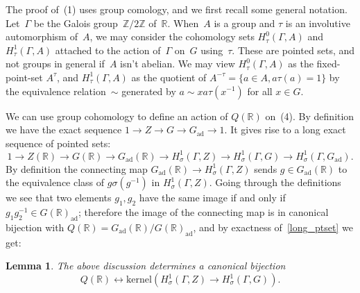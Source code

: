 \documentclass[10pt,leqno]{article}
\newtheorem{lemma}[equation]{Lemma}
\newcommand{\kernel}{\mathrm{kernel}}
\newcommand{\Gad}{G_\mathrm{ad}}
\newcommand{\R}{\mathbb R}
\newcommand{\Z}{\mathbb Z}
\newcommand\inv{^{-1}}
\begin{document}
The proof of~(1) uses group comology, and we first recall some general notation. Let~$\Gamma$ be the Galois group~$\Z/2\Z$ of~$\R$. When~$A$ is a group and $\tau$ is an involutive automorphism of~$A$, we may consider the cohomology sets $H^0_\tau(\Gamma, A)$ and $H^1_\tau(\Gamma, A)$ attached to the action of~$\Gamma$ on~$G$ using~$\tau$.  These are pointed sets, and not groups in general if~$A$ isn't abelian. We may view $H^0_\tau(\Gamma, A)$ as the fixed-point-set $A^{\tau}$, and $H^1_\tau(\Gamma,A)$ as the quotient of $A^{-\tau} = \{ a \in A, a\tau(a)=1\}$ by the equivalence relation~$\sim$ generated by $a \sim x a \tau(x^{-1})$ for all $x \in G$. 

We can use group cohomology to define an action of $Q(\R)$ on~(4). By definition we have the exact sequence $1\rightarrow Z \rightarrow G \rightarrow \Gad\rightarrow 1$. It 
gives rise to a long exact sequence of pointed sets:
\begin{equation} \label{long_ptset}
1\rightarrow Z(\R) \rightarrow G(\R) \rightarrow \Gad(\R) \rightarrow H^1_\sigma(\Gamma,Z)\rightarrow H^1_\sigma(\Gamma,G)\rightarrow H^1_\sigma(\Gamma,\Gad).
\end{equation}
By definition the connecting map  $ \Gad(\R) \rightarrow H^1_\sigma(\Gamma,Z)$ sends $g \in \Gad(\R)$ to the equivalence class of $g \sigma(g^{-1})$ in $H^1_\sigma(\Gamma, Z)$. Going through the definitions we see that   two elements  $g_1, g_2$ have the same image if and only if $g_1 g_{2}\inv \in G(\R)_{\mathrm{ad}}$; therefore the image of the connecting map is in canonical bijection with $Q(\R)=\Gad(\R)/G(\R)_{\mathrm{ad}}$, and by exactness of~\eqref{long_ptset} we get:

\begin{lemma}
  \label{l:Q}
The above discussion determines a canonical bijection 
 \begin{equation}\label{bij_q_1} Q(\R) \leftrightarrow \kernel(H^1_\sigma(\Gamma,Z)\rightarrow H^1_\sigma(\Gamma,G)).\end{equation}
\end{lemma}
\end{document}

